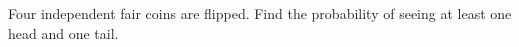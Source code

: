 Four independent fair coins are flipped. Find the probability of seeing at least one head and one tail.
